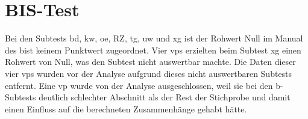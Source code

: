 \documentclass[11pt, twoside, a4paper]{book}		%
\begin{document}

\section{BIS-Test}
Bei den Subtests \gls{bd}, \gls{kw}, \gls{oe}, \gls{RZ}, \gls{tg}, \gls{uw} und \gls{xg} ist der Rohwert Null im Manual des \gls{bist} \citep{Jaeger1997} keinem Punktwert zugeordnet. Vier \glspl{vp} erzielten beim Subtest \gls{xg} einen Rohwert von Null, was den Subtest nicht auswertbar machte. Die Daten dieser vier \glspl{vp} wurden vor der Analyse aufgrund dieses nicht auswertbaren Subtests entfernt. Eine \gls{vp} wurde von der Analyse ausgeschlossen, weil sie bei den \gls{b}-Subtests deutlich schlechter Abschnitt als der Rest der Stichprobe und damit einen Einfluss auf die berechneten Zusammenhänge gehabt hätte.
\end{document}
